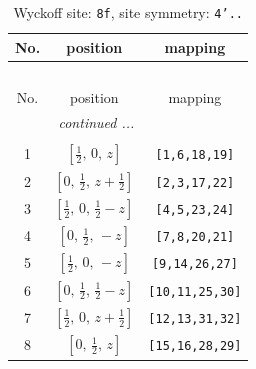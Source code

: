 \documentclass[fleqn,8pt]{jsarticle}
\begin{document}
\begin{longtable}{ccc}
\caption{Wyckoff site: {\tt 8f}, site symmetry: {\tt 4'..}}
 \\
 \hline \hline
No. & position & mapping \\ \hline \endfirsthead

\multicolumn{2}{l}{\tablename\ \thetable{}} \\
 \hline \hline
No. & position & mapping \\ \hline \endhead

 \hline \hline
\multicolumn{2}{r}{\footnotesize\it continued ...} \\ \endfoot

 \hline \hline
\multicolumn{2}{r}{} \\ \endlastfoot

1 & $\left[ \frac{1}{2},\, 0,\, z \right]$ & {\tt [1,6,18,19]} \\ \hline
2 & $\left[ 0,\, \frac{1}{2},\, z + \frac{1}{2} \right]$ & {\tt [2,3,17,22]} \\ \hline
3 & $\left[ \frac{1}{2},\, 0,\, \frac{1}{2} - z \right]$ & {\tt [4,5,23,24]} \\ \hline
4 & $\left[ 0,\, \frac{1}{2},\, - z \right]$ & {\tt [7,8,20,21]} \\ \hline
5 & $\left[ \frac{1}{2},\, 0,\, - z \right]$ & {\tt [9,14,26,27]} \\ \hline
6 & $\left[ 0,\, \frac{1}{2},\, \frac{1}{2} - z \right]$ & {\tt [10,11,25,30]} \\ \hline
7 & $\left[ \frac{1}{2},\, 0,\, z + \frac{1}{2} \right]$ & {\tt [12,13,31,32]} \\ \hline
8 & $\left[ 0,\, \frac{1}{2},\, z \right]$ & {\tt [15,16,28,29]} \\
\end{longtable}
\renewcommand{\arraystretch}{1.2}
\end{document}
